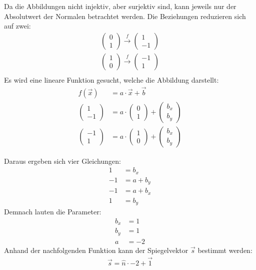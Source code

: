 Da die Abbildungen nicht injektiv, aber surjektiv sind, kann jeweils nur der Absolutwert der Normalen betrachtet
werden. Die Beziehungen reduzieren sich auf zwei:
\begin{align}
    \begin{pmatrix}0 \\ 1\end{pmatrix} \xrightarrow{f} \begin{pmatrix}1 \\ -1\end{pmatrix}\\
    \begin{pmatrix}1 \\ 0\end{pmatrix} \xrightarrow{f} \begin{pmatrix}-1 \\ 1\end{pmatrix}\\
\end{align}
Es wird eine lineare Funktion gesucht, welche die Abbildung darstellt:
\begin{align}
    f(\vec{x}) &= a \cdot \vec{x} + \vec{b}\\
    \begin{pmatrix}1 \\ -1\end{pmatrix} &= a \cdot \begin{pmatrix}0 \\ 1\end{pmatrix} + \begin{pmatrix}b_x \\ b_y\end{pmatrix}\\
    \begin{pmatrix}-1 \\ 1\end{pmatrix} &= a \cdot \begin{pmatrix}1 \\ 0\end{pmatrix} + \begin{pmatrix}b_x \\ b_y\end{pmatrix}
\end{align}

Daraus ergeben sich vier Gleichungen:
\begin{align}
    1 &= b_x\\
    -1 &= a + b_y\\
    -1 &= a + b_x\\
    1 &= b_y
\end{align}
Demnach lauten die Parameter:
\begin{align}
    b_x &= 1\\
    b_y &= 1\\
    a &= -2
\end{align}
Anhand der nachfolgenden Funktion kann der Spiegelvektor $\vec{s}$ bestimmt werden:
\begin{align}
    \vec{s} = \hat{n} \cdot -2 + \vec{1}
\end{align}

